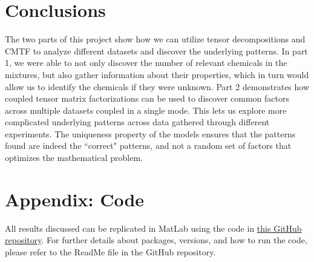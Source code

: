 \section*{Conclusions}
The two parts of this project show how we can utilize tensor decompositions and CMTF to analyze different datasets and discover the underlying patterns.
In part 1, we were able to not only discover the number of relevant chemicals in the mixtures, but also gather information about their properties, which in turn would allow us to identify the chemicals if they were unknown.
Part 2 demonstrates how coupled tensor matrix factorizations can be used to discover common factors across multiple datasets coupled in a single mode.
This lets us explore more complicated underlying patterns across data gathered through different experiments.
The uniqueness property of the models ensures that the patterns found are indeed the ``correct" patterns, and not a random set of factors that optimizes the mathematical problem.


\section*{Appendix: Code}
All results discussed can be replicated in MatLab using the code in \href{https://github.com/GauteJ1/Specialized-Syllabus-Project}{this GitHub repository}.
For further details about packages, versions, and how to run the code, please refer to the ReadMe file in the GitHub repository.
